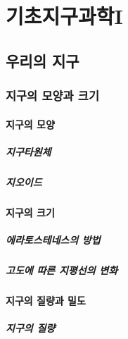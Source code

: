 \part{기초지구과학I}

\usechapterimagetrue
{} %
\chapter{우리의 지구}


\section{지구의 모양과 크기}

\subsection{지구의 모양}

\subsubsection{지구타원체}

\subsubsection{지오이드}


\subsection{지구의 크기}\index{}
\subsubsection{에라토스테네스의 방법}\index{}
\subsubsection{고도에 따른 지평선의 변화}\index{}

\subsection{지구의 질량과 밀도}\index{}
\subsubsection{지구의 질량}\index{}


